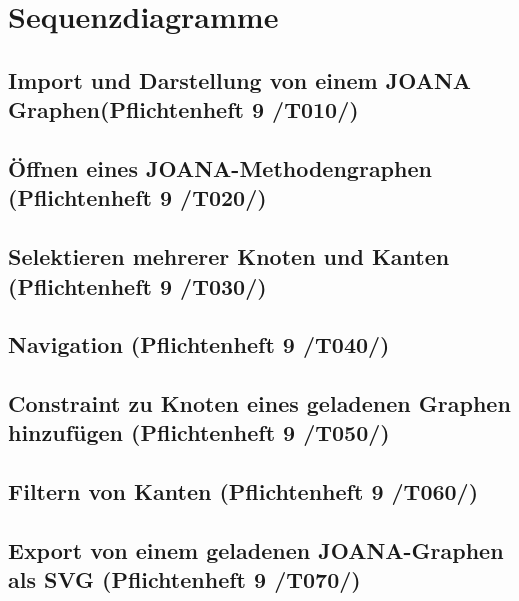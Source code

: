 \chapter{Sequenzdiagramme}

\section{Import und Darstellung von einem JOANA Graphen(Pflichtenheft 9 /T010/)}

\section{Öffnen eines JOANA-Methodengraphen (Pflichtenheft 9 /T020/)}

\section{Selektieren mehrerer Knoten und Kanten (Pflichtenheft 9 /T030/)}

\section{Navigation (Pflichtenheft 9 /T040/)}

\section{Constraint zu Knoten eines geladenen Graphen hinzufügen (Pflichtenheft 9 /T050/)}

\section{Filtern von Kanten (Pflichtenheft 9 /T060/)}

\section{Export von einem geladenen JOANA-Graphen als SVG (Pflichtenheft 9 /T070/)}